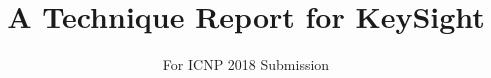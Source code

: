 \documentclass[sigconf]{acmart}
\begin{document}
\title{A Technique Report for KeySight}

\subtitle{For ICNP 2018 Submission}


\renewcommand{\shortauthors}{Anonymous Authors}
\newcommand{\start}[1]{\vspace{5pt}\noindent\textbf{#1}}
\newcommand{\ie}{\emph{i.e.,}}
\newcommand{\eg}{\emph{e.g.,}}
\newcommand{\etal}{\emph{et al.}\xspace}

\maketitle






\end{document}
